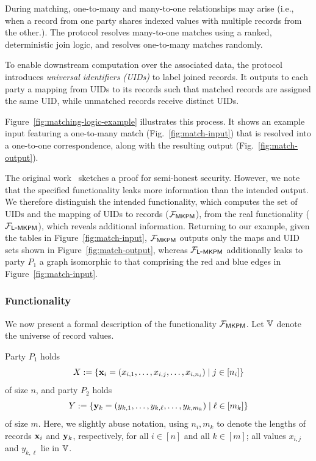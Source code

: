During matching, one-to-many and many-to-one relationships may arise (i.e., when
a record from one party shares indexed values with multiple records from the
other.). The protocol resolves many-to-one matches using a ranked, deterministic
join logic, and resolves one-to-many matches randomly.

To enable downstream computation over the associated data, the protocol
introduces \emph{universal identifiers (UIDs)} to label joined records. It
outputs to each party a mapping from UIDs to its records such that matched
records are assigned the same UID, while unmatched records receive distinct
UIDs.

Figure~\ref{fig:matching-logic-example} illustrates this process. It shows an
example input featuring a one-to-many match (Fig.~\ref{fig:match-input}) that is
resolved into a one-to-one correspondence, along with the resulting output
(Fig.~\ref{fig:match-output}).

 The original work~\cite{MKPMC} sketches a proof
for semi-honest security. However, we note that the specified functionality
leaks more information than the intended output. We therefore distinguish the
intended functionality, which computes the set of UIDs and the mapping of UIDs
to records ($\mathcal{F}_{\mathsf{MKPM}{}}$), from the real functionality
($\mathcal{F}_{\mathsf{L\mbox{-}MKPM}{}}$), which reveals additional information. Returning to our
example, given the tables in Figure~\ref{fig:match-input}, $\mathcal{F}_{\mathsf{MKPM}{}}$
outputs only the maps and UID sets shown in Figure~\ref{fig:match-output},
whereas $\mathcal{F}_{\mathsf{L\mbox{-}MKPM}{}}$ additionally leaks to party $P_1$ a graph isomorphic
to that comprising the red and blue edges in Figure~\ref{fig:match-input}.

\subsubsection{Functionality}
\label{sec:mkpmc_functionality}
We now present a formal description of the functionality $\mathcal{F}_{\mathsf{MKPM}{}}$. Let
$\Ispace$ denote the universe of record values.

Party $P_1$ holds
\[
  X:= \{\mathbf{x}_i = (x_{i,1}, \ldots, x_{i,j}, \ldots, x_{i, n_i}) \mid j \in
  [n_i]\}
\]
of size $n$,
and party $P_2$ holds
\[
  Y := \{\mathbf{y}_k = (y_{k,1}, \ldots, y_{k,\ell}, \ldots, y_{k, m_k}) \mid \ell \in
  [m_k]\}
\] of size $m$. Here, we slightly abuse notation, using $n_i, m_k $ to denote
the lengths of records $\mathbf{x}_i$ and $\mathbf{y}_k$, respectively, for all $i \in [n]$
and all $k \in [m]$; all values $x_{i,j}$ and $y_{k,\ell}$ lie in $\Ispace$.

